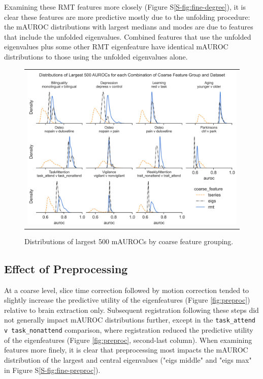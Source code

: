 \documentclass[12pt]{spieman}  %
\newcommand{\code}[1]{\small \texttt{#1} \normalsize}
\begin{document}
\begin{spacing}{2}
Examining these RMT features more closely (Figure S\ref{S-fig:fine-degree}),
it is clear these features are more predictive mostly due to the unfolding
procedure: the mAUROC distributions with largest medians and modes are due to
features that include the unfolded eigenvalues. Combined features that use
the unfolded eigenvalues plus some other RMT eigenfeature have identical
mAUROC distributions to those using the unfolded eigenvalues alone.


\begin{figure}
\begin{center}
\begin{tabular}{c}
\includegraphics[width=6.5in]{coarse_feature_largest_by_subgroup.png}
\end{tabular}
\end{center}
\caption
{ \label{fig:largest} Distributions of largest 500 mAUROCs by coarse feature grouping.}
\end{figure}

\subsection{Effect of Preprocessing}
At a coarse level, slice time correction followed by motion correction tended
to slightly increase the predictive utility of the eigenfeatures (Figure
\ref{fig:preproc}) relative to brain extraction only. Subsequent registration
following these steps did not generally impact mAUROC distributions further,
except in the \code{task\_attend v task\_nonattend} comparison, where
registration reduced the predictive utility of the eigenfeatures (Figure
\ref{fig:preproc}, second-last column). When examining features more finely, it
is clear that preprocessing most impacts the mAUROC distribution of the largest
and central eigenvalues ("eigs middle" and "eigs max" in Figure
S\ref{S-fig:fine-preproc}).


\end{spacing}
\end{document}
